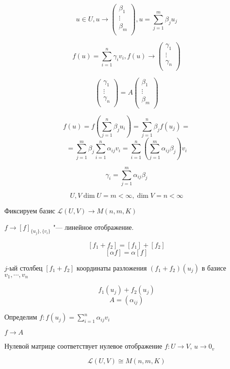 \begin{Rem}
$$u \in U, u \to 
\begin{pmatrix}
\beta_1\\
\vdots\\
\beta_m\\
\end{pmatrix}, u = \sum_{j = 1}^{m}\beta_{j}u_{j}$$

$$f(u) = \sum_{i = 1}^{n}\gamma_{i}v_{i}, f(u) \to 
\begin{pmatrix}
\gamma_1\\
\vdots\\
\gamma_n\\
\end{pmatrix}$$

$$
\begin{pmatrix}
\gamma_1\\
\vdots\\
\gamma_n\\
\end{pmatrix}
= A
\begin{pmatrix}
\beta_1\\
\vdots\\
\beta_m\\
\end{pmatrix} 
$$

$$f(u) = f(\sum_{j = 1}^{n}\beta_ju_i) = \sum_{j = 1}^{n}\beta_{j}f(u_j) = $$
$$= \sum_{j = 1}^{m}\beta_j \sum_{i = 1}^{n}\alpha_{ij}v_i = \sum_{i = 1}^{n}(\sum_{j = 1}^{m}\alpha_{ij}\beta_{j}) v_{i}$$

$$\gamma_{i} = \sum_{j = 1}^{m}\alpha_{ij}\beta_{j}$$
\end{Rem}
$$U, V \dim U = m < \infty, \dim V = n < \infty$$

Фиксируем базис 
$\mathcal{L}(U, V) \to M(n, m, K)$

$f \to [f]_{\{u_{j}\}, \{v_{i}\}}$ "--- линейное отображение.

$$[f_1 + f_2] = [f_1] + [f_2]$$
$$[\alpha f] = \alpha[f]$$
 
$j$-ый столбец $[f_1 + f_2]$ координаты разложения $(f_1 + f_2)(u_j)$ в базисе $v_1, \cdots, v_n$

$$f_1(u_j) + f_2(u_j)$$
$$A = (\alpha_{ij}) $$
                       
Определим $f \colon f(u_j) = \sum_{i = 1}^{n}\alpha_{ij}v_i$

$f \to A$

Нулевой матрице соответствует нулевое отображение $f \colon U \to V$, $u \to 0_v$

\begin{conseq}
$$\mathcal{L}(U, V) \cong M(n, m, K)$$
\end{conseq}

